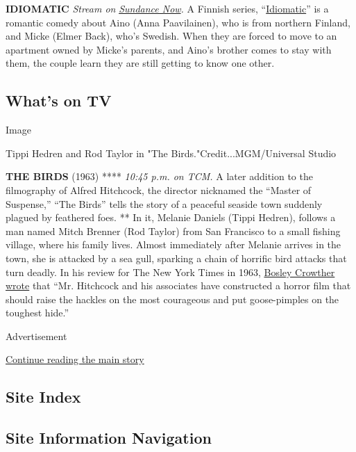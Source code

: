\textbf{IDIOMATIC} \emph{Stream on}
\href{https://www.sundancenow.com/series/watch/idiomatic/26360242b9115b0b?season=1}{\emph{Sundance
Now}}\emph{.} A Finnish series,
``\href{https://thesavvyscreener.com/2020/03/02/finnish-laughs-thrills/}{Idiomatic}''
is a romantic comedy about Aino (Anna Paavilainen), who is from northern
Finland, and Micke (Elmer Back), who's Swedish. When they are forced to
move to an apartment owned by Micke's parents, and Aino's brother comes
to stay with them, the couple learn they are still getting to know one
other.

\hypertarget{whats-on-tv}{%
\subsection{What's on TV}\label{whats-on-tv}}

Image

Tippi Hedren and Rod Taylor in "The Birds."Credit...MGM/Universal Studio

\textbf{THE BIRDS} (1963) **** \emph{10:45 p.m. on TCM.} A later
addition to the filmography of Alfred Hitchcock, the director nicknamed
the ``Master of Suspense,'' ``The Birds'' tells the story of a peaceful
seaside town suddenly plagued by feathered foes. ** In it, Melanie
Daniels (Tippi Hedren), follows a man named Mitch Brenner (Rod Taylor)
from San Francisco to a small fishing village, where his family lives.
Almost immediately after Melanie arrives in the town, she is attacked by
a sea gull, sparking a chain of horrific bird attacks that turn deadly.
In his review for The New York Times in 1963,
\href{https://www.nytimes3xbfgragh.onion/1963/04/01/archives/screen-the-birdshitchcocks-feathered-fiends-are-chilling.html}{Bosley
Crowther wrote} that ``Mr. Hitchcock and his associates have constructed
a horror film that should raise the hackles on the most courageous and
put goose-pimples on the toughest hide.''

Advertisement

\protect\hyperlink{after-bottom}{Continue reading the main story}

\hypertarget{site-index}{%
\subsection{Site Index}\label{site-index}}

\hypertarget{site-information-navigation}{%
\subsection{Site Information
Navigation}\label{site-information-navigation}}

